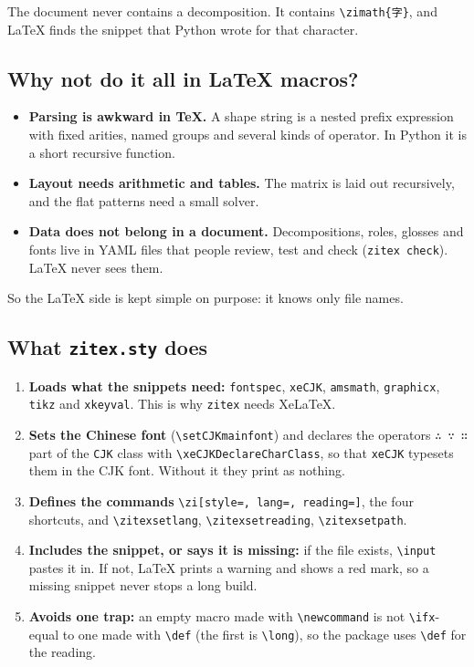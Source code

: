\documentclass[11pt]{article}
\newcommand{\cmd}[1]{\texttt{\textbackslash #1}}               %
\begin{document}
The document never contains a decomposition. It contains \cmd{zimath}\texttt{\{字\}}, and \LaTeX{} finds the snippet that Python wrote for that character.

\subsection{Why not do it all in \LaTeX{} macros?}
\begin{itemize}
  \item \textbf{Parsing is awkward in \TeX.} A shape string is a nested prefix expression with fixed arities, named groups and several kinds of operator. In Python it is a short recursive function.
  \item \textbf{Layout needs arithmetic and tables.} The matrix is laid out recursively, and the flat patterns need a small solver.
  \item \textbf{Data does not belong in a document.} Decompositions, roles, glosses and fonts live in YAML files that people review, test and check (\texttt{zitex check}). \LaTeX{} never sees them.
\end{itemize}
So the \LaTeX{} side is kept simple on purpose: it knows only file names.

\subsection{What \texttt{zitex.sty} does}
\begin{enumerate}
  \item \textbf{Loads what the snippets need:} \texttt{fontspec}, \texttt{xeCJK}, \texttt{amsmath}, \texttt{graphicx}, \texttt{tikz} and \texttt{xkeyval}. This is why \texttt{zitex} needs Xe\LaTeX.
  \item \textbf{Sets the Chinese font} (\cmd{setCJKmainfont}) and declares the operators \texttt{∴ ∵ ∷} part of the \texttt{CJK} class with \cmd{xeCJKDeclareCharClass}, so that \texttt{xeCJK} typesets them in the CJK font. Without it they print as nothing.
  \item \textbf{Defines the commands} \cmd{zi}\texttt{[style=, lang=, reading=]}, the four shortcuts, and \cmd{zitexsetlang}, \cmd{zitexsetreading}, \cmd{zitexsetpath}.
  \item \textbf{Includes the snippet, or says it is missing:} if the file exists, \cmd{input} pastes it in. If not, \LaTeX{} prints a warning and shows a red mark, so a missing snippet never stops a long build.
  \item \textbf{Avoids one trap:} an empty macro made with \cmd{newcommand} is not \cmd{ifx}-equal to one made with \cmd{def} (the first is \cmd{long}), so the package uses \cmd{def} for the reading.
\end{enumerate}
\end{document}
